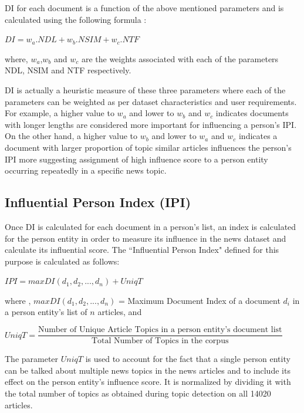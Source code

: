 \documentclass[10pt,journal,compsoc]{IEEEtran}
\begin{document}
DI for each document is a function of the above mentioned parameters and is calculated using the following formula :
\begin{center}

			$DI = w_a . NDL + w_b . NSIM + w_c . NTF $
\end{center}
where, $w_a$,$ w_b$ and $w_c$ are the weights associated with each of the parameters NDL, NSIM and NTF respectively.


DI is actually a heuristic measure of these three parameters where each of the parameters can be weighted as per dataset characteristics and user requirements. For example, a higher value to $w_a$ and lower to $w_b$ and $w_c$ indicates documents with longer lengths are considered more important for influencing a person's IPI. On the other hand, a higher value to $w_b$ and lower to $w_a$ and $w_c$ indicates a document with larger proportion of topic similar articles influences the person's IPI more suggesting assignment of high influence score to a person entity occurring repeatedly in a specific news topic.  

\subsection{Influential Person Index (IPI)}

Once DI is calculated for each document in a person's list, an index is calculated for the person entity in order to measure its influence in the news dataset and calculate its influential score. The ``Influential Person Index" defined for this purpose is calculated as follows:
		
\begin{center}
$IPI= max DI(d_1, d_2, ...,d_n)+ UniqT$
\end{center}

where , $max DI(d_1, d_2, ...,d_n)$ = Maximum Document Index of a document $d_i$ in a person entity's list of  $n$ articles, and
\begin{center} $UniqT = \dfrac{\text{Number of Unique Article Topics in a person entity's document list}}{\text{Total Number of Topics in the corpus}}$\end{center} 

The parameter $UniqT$  is used to account for the fact that a single person entity can be talked about multiple news topics in the news articles and to include its effect on the person entity's influence score. It is normalized by dividing it with the total number of topics as obtained during topic detection on all 14020 articles.
\end{document}
